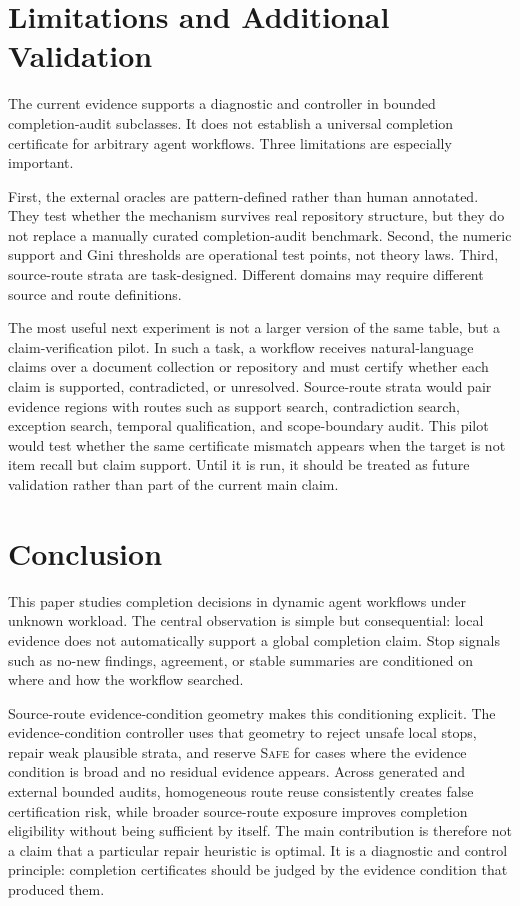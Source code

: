 \documentclass[letterpaper,10pt,twocolumn]{article}
\newcommand{\safe}{\textsc{Safe}}
\begin{document}
\section{Limitations and Additional Validation}

The current evidence supports a diagnostic and controller in bounded
completion-audit subclasses. It does not establish a universal completion
certificate for arbitrary agent workflows. Three limitations are especially
important.

First, the external oracles are pattern-defined rather than human annotated.
They test whether the mechanism survives real repository structure, but they do
not replace a manually curated completion-audit benchmark. Second, the numeric
support and Gini thresholds are operational test points, not theory laws. Third,
source-route strata are task-designed. Different domains may require different
source and route definitions.

The most useful next experiment is not a larger version of the same table, but a
claim-verification pilot. In such a task, a workflow receives natural-language
claims over a document collection or repository and must certify whether each
claim is supported, contradicted, or unresolved. Source-route strata would pair
evidence regions with routes such as support search, contradiction search,
exception search, temporal qualification, and scope-boundary audit. This pilot
would test whether the same certificate mismatch appears when the target is not
item recall but claim support. Until it is run, it should be treated as future
validation rather than part of the current main claim.

\section{Conclusion}

This paper studies completion decisions in dynamic agent workflows under unknown
workload. The central observation is simple but consequential: local evidence
does not automatically support a global completion claim. Stop signals such as
no-new findings, agreement, or stable summaries are conditioned on where and how
the workflow searched.

Source-route evidence-condition geometry makes this conditioning explicit. The
evidence-condition controller uses that geometry to reject unsafe local stops,
repair weak plausible strata, and reserve \safe{} for cases where the evidence
condition is broad and no residual evidence appears. Across generated and
external bounded audits, homogeneous route reuse consistently creates false
certification risk, while broader source-route exposure improves completion
eligibility without being sufficient by itself. The main contribution is
therefore not a claim that a particular repair heuristic is optimal. It is a
diagnostic and control principle: completion certificates should be judged by the
evidence condition that produced them.
\end{document}

